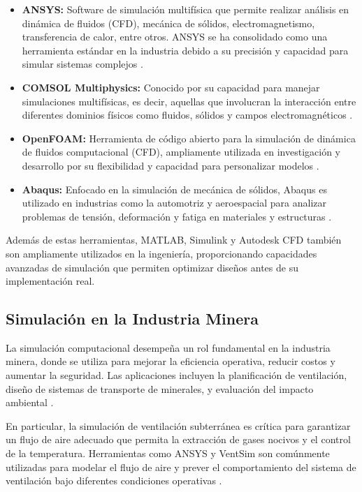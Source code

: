 \begin{itemize}
    \item \textbf{ANSYS:} Software de simulación multifísica que permite realizar análisis en dinámica de fluidos (CFD), mecánica de sólidos, electromagnetismo, transferencia de calor, entre otros. ANSYS se ha consolidado como una herramienta estándar en la industria debido a su precisión y capacidad para simular sistemas complejos \cite{zhao2019numerical}.
    \item \textbf{COMSOL Multiphysics:} Conocido por su capacidad para manejar simulaciones multifísicas, es decir, aquellas que involucran la interacción entre diferentes dominios físicos como fluidos, sólidos y campos electromagnéticos \cite{comsol2015}.
    \item \textbf{OpenFOAM:} Herramienta de código abierto para la simulación de dinámica de fluidos computacional (CFD), ampliamente utilizada en investigación y desarrollo por su flexibilidad y capacidad para personalizar modelos \cite{jasak2009openfoam}.
    \item \textbf{Abaqus:} Enfocado en la simulación de mecánica de sólidos, Abaqus es utilizado en industrias como la automotriz y aeroespacial para analizar problemas de tensión, deformación y fatiga en materiales y estructuras \cite{smith2014abaqus}.
\end{itemize}

Además de estas herramientas, MATLAB, Simulink y Autodesk CFD también son ampliamente utilizados en la ingeniería, proporcionando capacidades avanzadas de simulación que permiten optimizar diseños antes de su implementación real.

\subsection{Simulación en la Industria Minera}

La simulación computacional desempeña un rol fundamental en la industria minera, donde se utiliza para mejorar la eficiencia operativa, reducir costos y aumentar la seguridad. Las aplicaciones incluyen la planificación de ventilación, diseño de sistemas de transporte de minerales, y evaluación del impacto ambiental \cite{brune2008mine}.

En particular, la simulación de ventilación subterránea es crítica para garantizar un flujo de aire adecuado que permita la extracción de gases nocivos y el control de la temperatura. Herramientas como ANSYS y VentSim son comúnmente utilizadas para modelar el flujo de aire y prever el comportamiento del sistema de ventilación bajo diferentes condiciones operativas \cite{ventsim2016}. 

